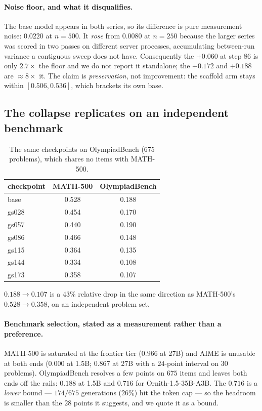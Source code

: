 \paragraph{Noise floor, and what it disqualifies.} The base model appears in both series, so
its difference is pure measurement noise: $0.0220$ at $n=500$. It \emph{rose} from $0.0080$
at $n=250$ because the larger series was scored in two passes on different server processes,
accumulating between-run variance a contiguous sweep does not have. Consequently the
$+0.060$ at step 86 is only $2.7\times$ the floor and we do not report it standalone; the
$+0.172$ and $+0.188$ are $\approx 8\times$ it. The claim is \emph{preservation}, not
improvement: the scaffold arm stays within $[0.506, 0.536]$, which brackets its own base.

\subsection{The collapse replicates on an independent benchmark}

\begin{table}[t]
\centering\small
\caption{The same checkpoints on OlympiadBench (675 problems), which shares no items with
MATH-500.}
\label{tab:olymp}
\begin{tabular}{lcc}
\toprule
checkpoint & MATH-500 & OlympiadBench \\
\midrule
base  & 0.528 & 0.188 \\
gs028 & 0.454 & 0.170 \\
gs057 & 0.440 & 0.190 \\
gs086 & 0.466 & 0.148 \\
gs115 & 0.364 & 0.135 \\
gs144 & 0.334 & 0.108 \\
gs173 & 0.358 & 0.107 \\
\bottomrule
\end{tabular}
\end{table}

$0.188 \to 0.107$ is a $43\%$ relative drop in the same direction as MATH-500's
$0.528 \to 0.358$, on an independent problem set.

\paragraph{Benchmark selection, stated as a measurement rather than a preference.}
MATH-500 is saturated at the frontier tier ($0.966$ at 27B) and AIME is unusable at both
ends ($0.000$ at 1.5B; $0.867$ at 27B with a $24$-point interval on $30$ problems).
OlympiadBench resolves a few points on $675$ items and leaves both ends off the rails:
$0.188$ at 1.5B and $0.716$ for Ornith-1.5-35B-A3B. The $0.716$ is a \emph{lower} bound ---
$174/675$ generations ($26\%$) hit the token cap --- so the headroom is smaller than the
$28$ points it suggests, and we quote it as a bound.

